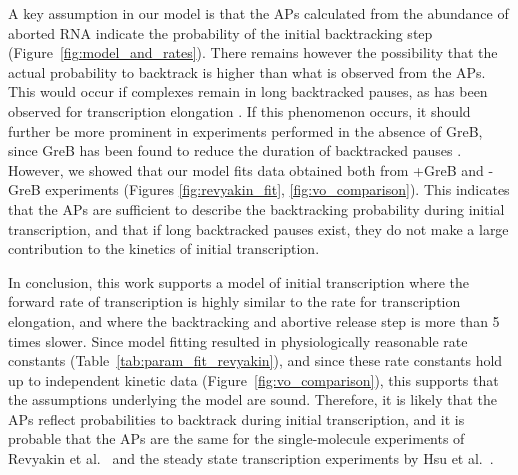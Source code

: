 A key assumption in our model is that the APs calculated from the abundance of
aborted RNA indicate the probability of the initial backtracking step
(Figure~\ref{fig:model_and_rates}). There remains however the possibility that
the actual probability to backtrack is higher than what is observed from the
APs. This would occur if complexes remain in long backtracked
pauses, as has been observed for transcription elongation
\cite{shaevitz_backtracking_2003}. If this phenomenon occurs, it should further
be more prominent in experiments performed in the absence of GreB, since GreB
has been found to reduce the duration of backtracked pauses
\cite{shaevits_backtracking_2003}. However, we showed that our model fits data
obtained both from +GreB and -GreB experiments (Figures
\ref{fig:revyakin_fit}, \ref{fig:vo_comparison}). This indicates that the APs
are sufficient to describe the backtracking probability during initial
transcription, and that if long backtracked pauses exist, they do not make a
large contribution to the kinetics of initial transcription.

In conclusion, this work supports a model of initial transcription where the
forward rate of transcription is highly similar to the rate for transcription
elongation, and where the backtracking and abortive release step is more than
5 times slower. Since model fitting resulted in physiologically reasonable
rate constants (Table~\ref{tab:param_fit_revyakin}), and since these rate
constants hold up to independent kinetic data
(Figure~\ref{fig:vo_comparison}), this supports that the assumptions
underlying the model are sound. Therefore, it is likely that the APs
reflect probabilities to backtrack during initial transcription, and it is
probable that the APs are the same for the single-molecule experiments of
Revyakin et al.\ \cite{revyakin_abortive_2006} and the steady state
transcription experiments by Hsu et al.\ \cite{hsu_initial_2006}.
 
